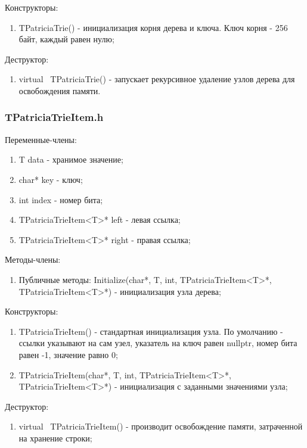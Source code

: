 \documentclass[12pt]{article}
\begin{document}
Конструкторы:
\begin{enumerate}
	\item TPatriciaTrie() - инициализация корня дерева и ключа. Ключ корня - 256 байт, каждый равен нулю;
\end{enumerate}

Деструктор:
\begin{enumerate}
	\item virtual ~TPatriciaTrie() - запускает рекурсивное удаление узлов дерева для освобождения памяти.
\end{enumerate}

\subsubsection*{TPatriciaTrieItem.h}

Переменные-члены:
\begin{enumerate}
	\item T data - хранимое значение;
	\item char* key - ключ;
	\item int index - номер бита;
	\item TPatriciaTrieItem<T>* left - левая ссылка;
	\item TPatriciaTrieItem<T>* right - правая ссылка;
\end{enumerate}

Методы-члены:
\begin{enumerate}
	\item Публичные методы:
		\subitem Initialize(char*, T, int, TPatriciaTrieItem<T>*, TPatriciaTrieItem<T>*) - инициализация узла дерева;
\end{enumerate}


Конструкторы:
\begin{enumerate}
	\item TPatriciaTrieItem() - стандартная инициализация узла. По умолчанию - ссылки указывают на сам узел, указатель на ключ равен nullptr, номер бита равен -1, значение равно 0;
	\item TPatriciaTrieItem(char*, T, int, TPatriciaTrieItem<T>*, TPatriciaTrieItem<T>*) - инициализация с заданными значениями узла;
\end{enumerate}

Деструктор:
\begin{enumerate}
	\item virtual ~TPatriciaTrieItem() - производит освобождение памяти, затраченной на хранение строки;
\end{enumerate}
\end{document}
